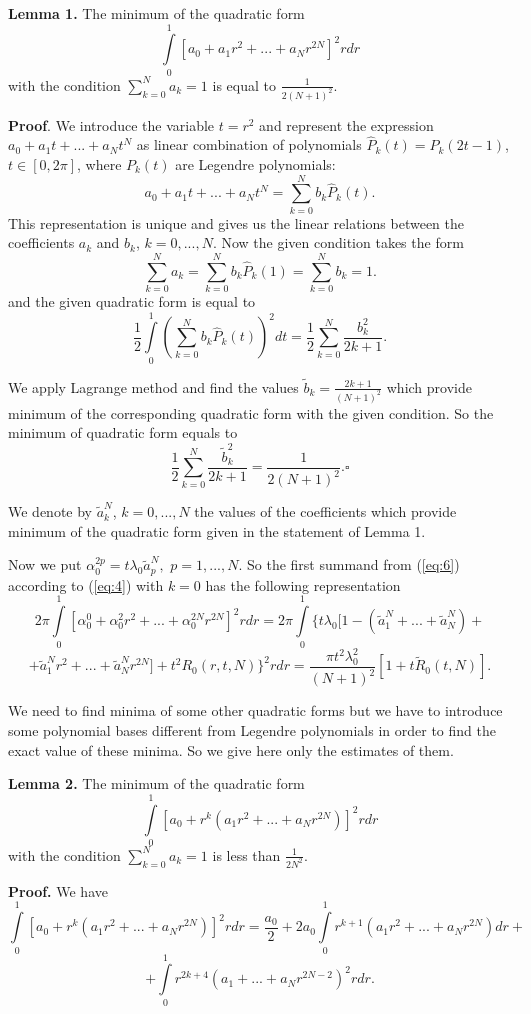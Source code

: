 \documentclass{amsart}
\begin{document}
{\bf Lemma 1.} The minimum of the quadratic form
$$
\int\limits_0^1[a_0+a_1 r^2+...+a_N r^{2N}]^2 r dr
$$
with the condition $\sum\limits_{k=0}^N a_k=1$ is equal to
$\frac{1}{2(N+1)^2}$.

{\bf Proof}. We introduce the variable $t=r^2$ and represent the
expression $a_0+a_1 t+...+a_N t^N$ as linear combination of
polynomials $\hat{P}_k(t)=P_k(2t-1)$, $t\in[0,2\pi]$, where $P_k(t)$
are Legendre polynomials:
$$
a_0+a_1 t+...+a_N t^N=\sum\limits_{k=0}^N b_k \hat{P}_k(t).
$$
This representation is unique and gives us the linear relations
between the coefficients $a_k$ and $b_k$, $k=0,...,N$. Now the given
condition takes the form
$$
\sum\limits_{k=0}^N a_k=\sum\limits_{k=0}^N
b_k\hat{P}_k(1)=\sum\limits_{k=0}^N b_k=1.
$$
and the given quadratic form is equal to
$$
\frac{1}{2}\int\limits_0^1(\sum\limits_{k=0}^N b_k \hat{P}_k(t))^2
dt =\frac{1}{2}\sum\limits_{k=0}^N \frac{b_k^2}{2k+1}.
$$

We apply Lagrange method and find the values
$\tilde{b}_k=\frac{2k+1}{(N+1)^2}$ which provide minimum of the
corresponding quadratic form with the given condition. So the
minimum of quadratic form equals to
$$
\frac{1}{2}\sum\limits_{k=0}^N
\frac{\tilde{b}_k^2}{2k+1}=\frac{1}{2(N+1)^2}.\square
$$


We denote by $\tilde{a}_k^N$, $k=0,...,N$ the values of the
coefficients which provide minimum of the quadratic form given in
the statement of Lemma 1.

Now we put $\alpha_0^{2p}= t\lambda_0 \tilde{a}_p^N,$ $p=1,...,N$.
So the first summand from (\ref{eq:6}) according to (\ref{eq:4})
with $k=0$ has the following representation
$$
2\pi\int\limits_0^1[\alpha_0^0+\alpha_0^2 r^2+...+\alpha_0^{2N}
r^{2N}]^2 r dr =
2\pi\int\limits_0^1\{t\lambda_0[1-(\tilde{a}_1^N+...+\tilde{a}_N^N)+
$$
$$
+\tilde{a}_1^N r^2+...+\tilde{a}_N^N r^{2N}]+t^2 R_0(r,t,N)\}^2 r
dr=\frac{\pi t^2 \lambda_0^2}{(N+1)^2}[1+t \tilde{R}_0(t,N)].
$$

We need to find  minima of some other quadratic forms but we have to
introduce some polynomial bases different from Legendre polynomials
in order to find the exact value of these minima. So we give here
only the estimates of them.

{\bf Lemma 2.} The minimum of the quadratic form
$$
\int\limits_0^1[a_0+r^k(a_1 r^2+...+a_N r^{2N})]^2 r dr
$$
with the condition $\sum\limits_{k=0}^N a_k=1$ is less than
$\frac{1}{2 N^2}$.

{\bf Proof.} We have
$$
\int\limits_0^1[a_0+r^k(a_1 r^2+...+a_N r^{2N})]^2 r
dr=\frac{a_0}{2}+2 a_0 \int\limits_0^1 r^{k+1}(a_1 r^2+...+a_N
r^{2N}) dr +
$$
$$
+\int\limits_0^1 r^{2k+4}(a_1+...+a_N r^{2N-2})^2 r dr.
$$
\end{document}
